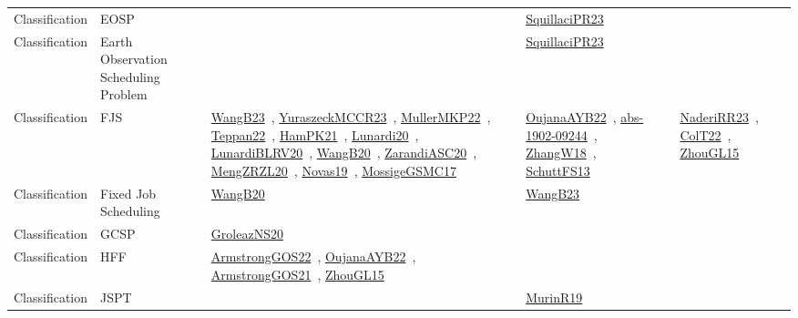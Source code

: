 {\begin{longtable}{lp{3cm}>{\raggedright\arraybackslash}p{6cm}>{\raggedright\arraybackslash}p{6cm}>{\raggedright\arraybackslash}p{8cm}}
Classification & EOSP &  & \href{works/SquillaciPR23.pdf}{SquillaciPR23}~\cite{SquillaciPR23} & \\
Classification & Earth Observation Scheduling Problem &  & \href{works/SquillaciPR23.pdf}{SquillaciPR23}~\cite{SquillaciPR23} & \\
Classification & FJS & \href{works/WangB23.pdf}{WangB23}~\cite{WangB23}, \href{works/YuraszeckMCCR23.pdf}{YuraszeckMCCR23}~\cite{YuraszeckMCCR23}, \href{works/MullerMKP22.pdf}{MullerMKP22}~\cite{MullerMKP22}, \href{works/Teppan22.pdf}{Teppan22}~\cite{Teppan22}, \href{works/HamPK21.pdf}{HamPK21}~\cite{HamPK21}, \href{works/Lunardi20.pdf}{Lunardi20}~\cite{Lunardi20}, \href{works/LunardiBLRV20.pdf}{LunardiBLRV20}~\cite{LunardiBLRV20}, \href{works/WangB20.pdf}{WangB20}~\cite{WangB20}, \href{works/ZarandiASC20.pdf}{ZarandiASC20}~\cite{ZarandiASC20}, \href{works/MengZRZL20.pdf}{MengZRZL20}~\cite{MengZRZL20}, \href{works/Novas19.pdf}{Novas19}~\cite{Novas19}, \href{works/MossigeGSMC17.pdf}{MossigeGSMC17}~\cite{MossigeGSMC17} & \href{works/OujanaAYB22.pdf}{OujanaAYB22}~\cite{OujanaAYB22}, \href{works/abs-1902-09244.pdf}{abs-1902-09244}~\cite{abs-1902-09244}, \href{works/ZhangW18.pdf}{ZhangW18}~\cite{ZhangW18}, \href{works/SchuttFS13.pdf}{SchuttFS13}~\cite{SchuttFS13} & \href{works/NaderiRR23.pdf}{NaderiRR23}~\cite{NaderiRR23}, \href{works/ColT22.pdf}{ColT22}~\cite{ColT22}, \href{works/ZhouGL15.pdf}{ZhouGL15}~\cite{ZhouGL15}\\
Classification & Fixed Job Scheduling & \href{works/WangB20.pdf}{WangB20}~\cite{WangB20} & \href{works/WangB23.pdf}{WangB23}~\cite{WangB23} & \\
Classification & GCSP & \href{works/GroleazNS20.pdf}{GroleazNS20}~\cite{GroleazNS20} &  & \\
Classification & HFF & \href{works/ArmstrongGOS22.pdf}{ArmstrongGOS22}~\cite{ArmstrongGOS22}, \href{works/OujanaAYB22.pdf}{OujanaAYB22}~\cite{OujanaAYB22}, \href{works/ArmstrongGOS21.pdf}{ArmstrongGOS21}~\cite{ArmstrongGOS21}, \href{works/ZhouGL15.pdf}{ZhouGL15}~\cite{ZhouGL15} &  & \\
Classification & JSPT &  & \href{works/MurinR19.pdf}{MurinR19}~\cite{MurinR19} & \\

\end{longtable}}
